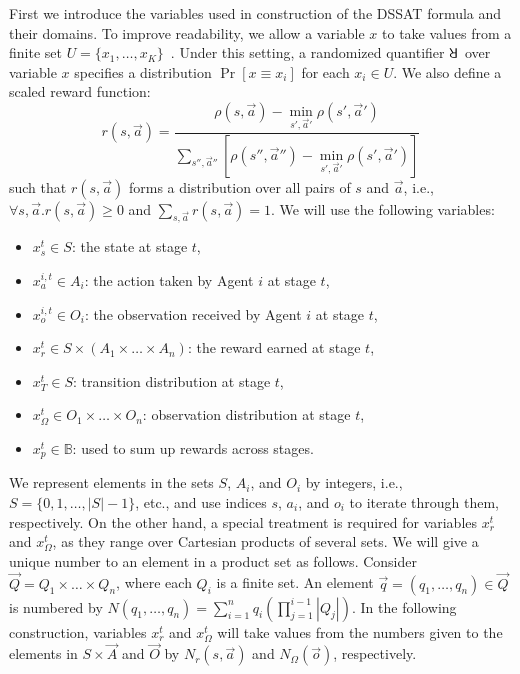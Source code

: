 First we introduce the variables used in construction of the DSSAT formula and their domains.
To improve readability, we allow a variable $x$ to take values from a finite set $U=\{x_1,\ldots,x_K\}$~\cite{Salmon2020}.
Under this setting, a randomized quantifier $\random{}$ over variable $x$ specifies a distribution $\Pr[x\equiv x_i]$ for each $x_i\in U$.
We also define a scaled reward function:
\[
    r(s,\vec{a})=\frac{\rho(s,\vec{a})-\min_{s',\vec{a}'}\rho(s',\vec{a}')}{\sum_{s'',\vec{a}''}[\rho(s'',\vec{a}'')-\min_{s',\vec{a}'}\rho(s',\vec{a}')]}
\]
such that $r(s,\vec{a})$ forms a distribution over all pairs of $s$ and $\vec{a}$, i.e., $\forall s,\vec{a}.r(s,\vec{a})\geq 0$ and $\sum_{s,\vec{a}}r(s,\vec{a})=1$.
We will use the following variables:
\begin{itemize}
    \item $x_s^t\in S$: the state at stage $t$,
    \item $x_a^{i,t}\in A_i$: the action taken by Agent $i$ at stage $t$,
    \item $x_o^{i,t}\in O_i$: the observation received by Agent $i$ at stage $t$,
    \item $x_r^t\in S\times (A_1\times\ldots\times A_n)$: the reward earned at stage $t$,
    \item $x_T^t\in S$: transition distribution at stage $t$,
    \item $x_\Omega^t\in O_1\times\ldots\times O_n$: observation distribution at stage $t$,
    \item $x_p^t\in \mathbb{B}$: used to sum up rewards across stages.
\end{itemize}

We represent elements in the sets $S$, $A_i$, and $O_i$ by integers, i.e., $S=\{0,1,\ldots,|S|-1\}$, etc., and use indices $s$, $a_i$, and $o_i$ to iterate through them, respectively.
On the other hand, a special treatment is required for variables $x_r^t$ and $x_\Omega^t$, as they range over Cartesian products of several sets.
We will give a unique number to an element in a product set as follows.
Consider $\vec{Q}=Q_1\times\ldots\times Q_n$, where each $Q_i$ is a finite set.
An element $\vec{q}=(q_1,\ldots,q_n)\in \vec{Q}$ is numbered by $N(q_1,\ldots,q_n)=\sum_{i=1}^n q_i(\prod_{j=1}^{i-1}|Q_j|)$.
In the following construction, variables $x_r^t$ and $x_\Omega^t$ will take values from the numbers given to the elements in $S\times\vec{A}$ and $\vec{O}$ by $N_r(s,\vec{a})$ and $N_\Omega(\vec{o})$, respectively.

